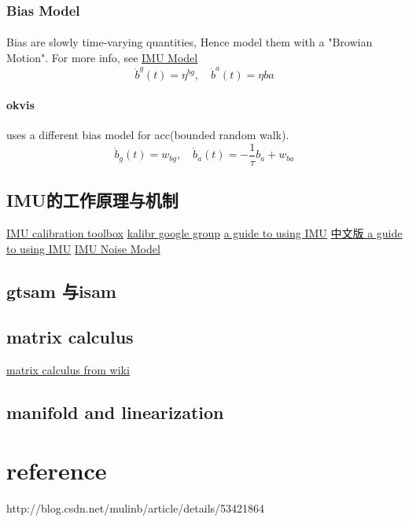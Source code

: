 \documentclass[10pt,a4paper]{article}
\begin{document}
\subsubsection{Bias Model}
\paragraph{}Bias are slowly time-varying quantities, Hence model them with a "Browian Motion".
For more info, see \href{http://www.cnblogs.com/youzx/p/6291327.html?utm_source=itdadao&utm_medium=referral}{IMU Model}
\begin{equation}
\dot{b}^g(t) = \eta^{bg}, \quad \dot{b}^a(t) = \eta{ba}
\end{equation}

\paragraph{okvis} uses a different bias model for acc(bounded random walk).
\begin{equation}
\dot{b}_g(t) = w_{bg}, \quad \dot{b}_a(t) = -\frac{1}{\tau} b_a + w_{ba}
\end{equation}


\subsection{IMU的工作原理与机制}
\href{https://github.com/ethz-asl/kalibr}{IMU calibration toolbox}
\href{https://groups.google.com/forum/#!topic/kalibr-users/m17VpekSHtg}{kalibr google group}
\href{https://www.dfrobot.com/blog-206.html}{a guide to using IMU}
\href{http://www.jianshu.com/p/69dd18638b8e}{中文版 a guide to using IMU}
\href{http://www.cnblogs.com/youzx/p/6291327.html?utm_source=itdadao&utm_medium=referral}{IMU Noise Model}

\subsection{gtsam 与isam}
\subsection{matrix calculus}
\href{https://en.wikipedia.org/wiki/Matrix_calculus}{matrix calculus from wiki}
\subsection{manifold and linearization}


\section{reference}
http://blog.csdn.net/mulinb/article/details/53421864
\end{document}

